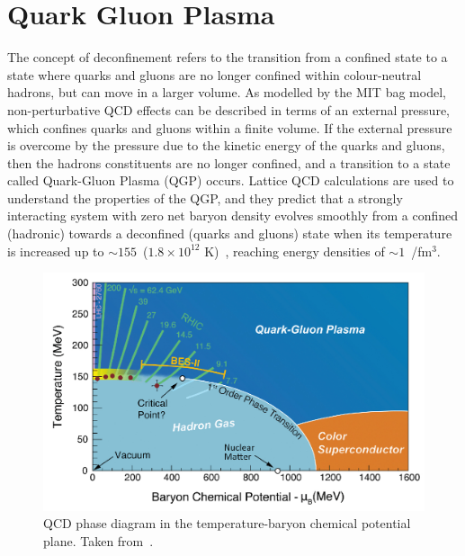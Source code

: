 \section{Quark Gluon Plasma}
The concept of deconfinement refers to the transition from a confined state to a state where quarks and gluons are no longer confined within colour-neutral hadrons, but can move in a larger volume. As modelled by the MIT bag model, non-perturbative QCD effects can be described in terms of an external pressure, which confines quarks and gluons within a finite volume. If the external pressure is overcome by the pressure due to the kinetic energy of the quarks and gluons, then the hadrons constituents are no longer confined, and a transition to a state called Quark-Gluon Plasma (QGP) occurs. Lattice QCD calculations are used to understand the properties of the QGP, and they predict that a strongly interacting system with zero net baryon density evolves smoothly from a confined (hadronic) towards a deconfined (quarks and gluons) state when its temperature is increased up to $\sim155$~\mev ($1.8\times 10^{12}$ K)~\cite{HotQCD:2014kol, Borsanyi:2013bia}, reaching energy densities of $\sim 1$~\gev/fm$^3$.

\begin{figure}
  \centering
  \includegraphics[width=0.7\linewidth]{Figures/Chapter 1/QCD-diagram.jpg}
  \caption{QCD phase diagram in the temperature-baryon chemical potential plane. Taken from~\cite{QCD_diagram}.}
  \label{fig:PhaseDiagram}
\end{figure}

